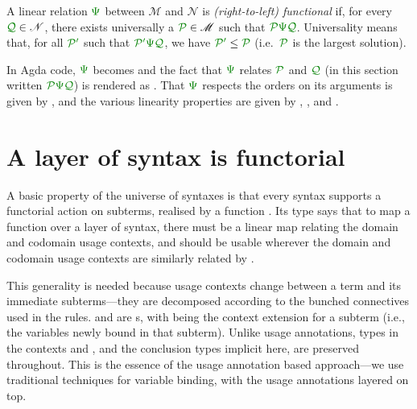 \begin{definition}\label{def:functional-linear-relation}
  A linear relation $\gr\Psi$ between $\mathscr M$ and $\mathscr N$ is
  \emph{(right-to-left) functional} if, for every $\grQ \in \mathscr N$, there
  exists universally a $\grP \in \mathscr M$ such that $\grP\gr\Psi\grQ$.
  Universality means that, for all $\grPprime$ such that $\grPprime\gr\Psi\grQ$,
  we have $\grPprime \leq \grP$ (i.e.\ $\grP$ is the largest solution).
\end{definition}

In Agda code, $\gr\Psi$ becomes \AgdaBound{$\Psi$} and the fact that $\gr\Psi$
relates $\grP$ and $\grQ$ (in this section written $\grP\gr\Psi\grQ$) is
rendered as
\AgdaSpace{}\AgdaSpace{}.
That $\gr\Psi$ respects the orders on its arguments is given by
, and the various linearity properties are given by
, , and .

\section{A layer of syntax is functorial}\label{sec:functorial}

A basic property of the universe of syntaxes
is that every syntax supports a functorial action on subterms, realised by a
function .
Its type says that to map a function 
over a layer of syntax, there must be a linear map \AgdaBound{$\Psi$} relating the
domain and codomain usage contexts, and  should be usable
wherever the domain and codomain usage contexts are similarly related by
\AgdaBound{$\Psi$}.


This generality is needed because usage contexts change between
a term and its immediate subterms---they are decomposed according to the bunched connectives used in the rules.
 and  are s, with
\AgdaBound{$\Theta$} being the context extension for a subterm (i.e., the
variables newly bound in that subterm).
Unlike usage annotations, types in the contexts \AgdaBound{$\gamma$} and \AgdaBound{$\delta$}, and the conclusion types implicit here, are preserved throughout.
This is the essence of the usage annotation based approach---we use traditional techniques for variable binding, with the usage annotations layered on top.

